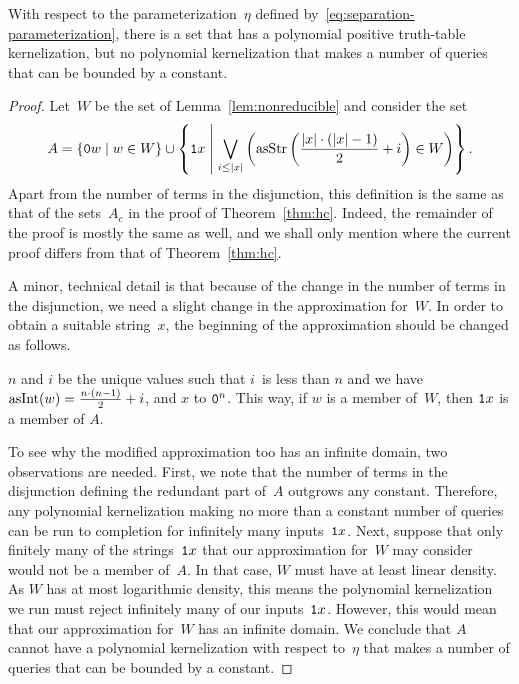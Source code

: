 \begin{theorem}
\label{thm:htt}%
  With respect to the parameterization~$\eta$ defined by~\eqref{eq:separation-parameterization}, there is a set that has a polynomial positive truth-table kernelization, but no polynomial kernelization that makes a number of queries that can be bounded by a constant.
\end{theorem}
\begin{proof}
  Let~$W$ be the set of Lemma~\ref{lem:nonreducible} and consider the set
  \begin{equation*}
    A \deq \{\bits{0}w \st w \in W\} \cup \left\{\bits{1}x \st[\middle] \bigvee_{i \le \length{x}} \left(\asStr\left(\frac{\length{x} \cdot (\length{x} - 1)}{2} + i\right) \in W\right)\right\}.
  \end{equation*}
  Apart from the number of terms in the disjunction, this definition is the same as that of the sets~$A_c$ in the proof of Theorem~\ref{thm:hc}.
  Indeed, the remainder of the proof is mostly the same as well, and we shall only mention where the current proof differs from that of Theorem~\ref{thm:hc}.

  A minor, technical detail is that because of the change in the number of terms in the disjunction, we need a slight change in the approximation for~$W$.
  In order to obtain a suitable string~$x$, the beginning of the approximation should be changed as follows.
  \begin{codelisting}
  \item
     $n$ and $i$ be the unique values such that $i$~is less than $n$ and we have $\asNat(w) = \frac{n \cdot (n - 1)}{2} + i$, and  $x$ to $\bits{0}^n$.
    This way, if $w$ is a member of~$W$, then $\bits{1}x$ is a member of $A$.
  \end{codelisting}

  To see why the modified approximation too has an infinite domain, two observations are needed.
  First, we note that the number of terms in the disjunction defining the redundant part of~$A$ outgrows any constant.
  Therefore, any polynomial kernelization making no more than a constant number of queries can be run to completion for infinitely many inputs~$\bits{1}x$.
  Next, suppose that only finitely many of the strings~$\bits{1}x$ that our approximation for~$W$ may consider would not be a member of~$A$.
  In that case, $W$ must have at least linear density.
  As $W$ has at most logarithmic density, this means the polynomial kernelization we run must reject infinitely many of our inputs~$\bits{1}x$.
  However, this would mean that our approximation for~$W$ has an infinite domain.
  We conclude that $A$ cannot have a polynomial kernelization with respect to~$\eta$ that makes a number of queries that can be bounded by a constant.
\end{proof}

